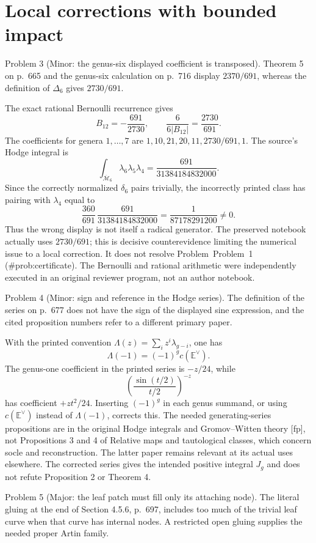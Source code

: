 \documentclass[10pt]{article}
\begin{document}
\section*{Local corrections with bounded impact}
Problem 3 (Minor: the genus-six displayed coefficient is transposed).  Theorem 5 on p. 665 and the genus-six calculation on p. 716 display \(2370/691\), whereas the definition of \(\Delta_6\) gives \(2730/691\).\par
The exact rational Bernoulli recurrence gives \[B_{12}=-\frac{691}{2730},\qquad
 \frac{6}{6|B_{12}|}=\frac{2730}{691}.\] The coefficients for genera \(1,\ldots,7\) are \(1,10,21,20,11,2730/691,1\). The source’s Hodge integral is \[\int_{\overline{\mathcal M}_6}\lambda_6\lambda_5\lambda_4
                  =\frac{691}{31384184832000}.\] Since the correctly normalized \(\delta_6\) pairs trivially, the incorrectly printed class has pairing with \(\lambda_4\) equal to \[\frac{360}{691}\,
 \frac{691}{31384184832000}
             =\frac{1}{87178291200}\ne0.\] Thus the wrong display is not itself a radical generator. The preserved notebook actually uses \(2730/691\); this is decisive counterevidence limiting the numerical issue to a local correction. It does not resolve Problem Problem 1 (\#prob:certificate). The Bernoulli and rational arithmetic were independently executed in an original reviewer program, not an author notebook.\par
Problem 4 (Minor: sign and reference in the Hodge series).  The definition of the series on p. 677 does not have the sign of the displayed sine expression, and the cited proposition numbers refer to a different primary paper.\par
With the printed convention \(\Lambda(z)=\sum_i z^i\lambda_{g-i}\), one has \[\Lambda(-1)=(-1)^g c(\mathbb E^\vee).\] The genus-one coefficient in the printed series is \(-z/24\), while \[\left(\frac{\sin(t/2)}{t/2}\right)^{-z}\] has coefficient \(+zt^2/24\). Inserting \((-1)^g\) in each genus summand, or using \(c(\mathbb E^\vee)\) instead of \(\Lambda(-1)\), corrects this. The needed generating-series propositions are in the original Hodge integrals and Gromov–Witten theory [fp], not Propositions 3 and 4 of Relative maps and tautological classes, which concern socle and reconstruction. The latter paper remains relevant at its actual uses elsewhere. The corrected series gives the intended positive integral \(J_g\) and does not refute Proposition 2 or Theorem 4.\par
Problem 5 (Major: the leaf patch must fill only its attaching node).  The literal gluing at the end of Section 4.5.6, p. 697, includes too much of the trivial leaf curve when that curve has internal nodes. A restricted open gluing supplies the needed proper Artin family.\par
\end{document}
